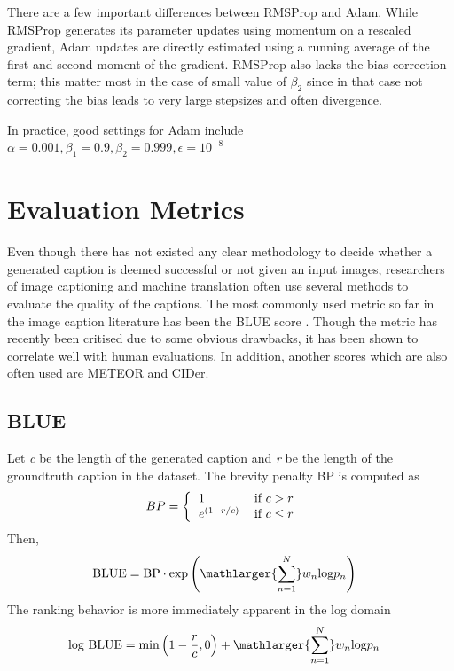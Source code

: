 	There are a few important differences between RMSProp and Adam. While RMSProp generates its parameter updates using momentum on a rescaled gradient, Adam updates are directly estimated using a running average of the first and second moment of the gradient. RMSProp also lacks the bias-correction term; this matter most in the case of small value of $\beta_2$ since in that case not correcting the bias leads to very large stepsizes and often divergence.

	In practice, good settings for Adam include $\alpha = 0.001, \beta_1 = 0.9, \beta_2 = 0.999, \epsilon = 10^{-8}$
\section{Evaluation Metrics}
\label{sec:lang_metric}
Even though there has not existed any clear methodology to decide whether a generated caption is deemed successful or not given an input images, researchers of image captioning and machine translation often use several methods to evaluate the quality of the captions. The most commonly used metric so far in the image caption literature has been the BLUE score \cite{Papineni:2002:BMA:1073083.1073135}. Though the metric has recently been critised due to some obvious drawbacks, it has been shown to correlate well with human evaluations. In addition, another scores which are also often used are METEOR and CIDer.

\subsection{BLUE}
Let \textit{c} be the length of the generated caption and \textit{r} be the length of the groundtruth caption in the dataset. The brevity penalty BP is computed as
\begin{align}
	BP &= \left\{
		\begin{tabular}{l l}
			1 & if $c > r$ \\
			$e^{\left(1 - r/c\right)}$ & if $c \leq r$
		\end{tabular}
	\right.
\end{align}
Then,
	\begin{align}
		\centering
		\text{BLUE} &= \text{BP} \cdot \text{exp} \left( \mathlarger{ \sum^N_{n=1} } w_n \text{log} p_n \right) 
	\end{align}
The ranking behavior is more immediately apparent in the log domain
\begin{align*}
	\text{log BLUE} &= \text{min} \left(1 - \frac{r}{c}, 0\right) + \mathlarger{\sum^N_{n=1}} w_n\text{log}p_n 
\end{align*}


